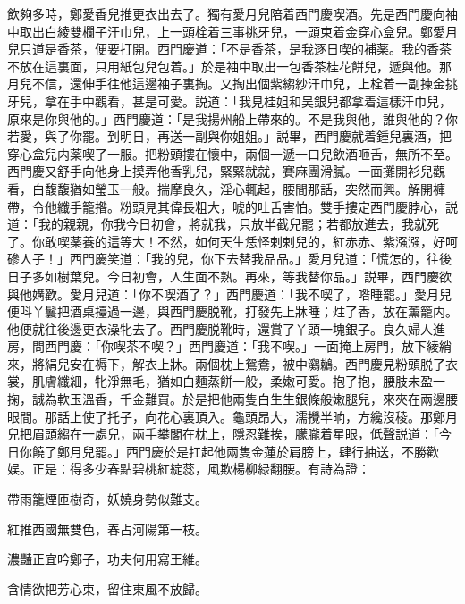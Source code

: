 飲夠多時，鄭愛香兒推更衣出去了。獨有愛月兒陪着西門慶喫酒。先是西門慶向袖中取出白綾雙欄子汗巾兒，上一頭栓着三事挑牙兒，一頭束着金穿心盒兒。鄭愛月兒只道是香茶，便要打開。西門慶道：「不是香茶，是我逐日喫的補薬。我的香茶不放在這裏面，只用紙包兒包着。」於是袖中取出一包香茶桂花餅兒，遞與他。那月兒不信，還伸手往他這邊袖子裏掏。又掏出個紫縐紗汗巾兒，上栓着一副揀金挑牙兒，拿在手中觀看，甚是可愛。説道：「我見桂姐和吴銀兒都拿着這樣汗巾兒，原來是你與他的。」西門慶道：「是我揚州船上帶來的。不是我與他，誰與他的？你若愛，與了你罷。到明日，再送一副與你姐姐。」説畢，西門慶就着鍾兒裏酒，把穿心盒兒内薬喫了一服。把粉頭摟在懷中，兩個一遞一口兒飲酒咂舌，無所不至。西門慶又舒手向他身上摸弄他香乳兒，緊緊就就，賽麻團滑膩。一面攤開衫兒觀看，白馥馥猶如瑩玉一般。揣摩良久，淫心輒起，腰間那話，突然而興。解開褲帶，令他纖手籠揝。粉頭見其偉長粗大，唬的吐舌害怕。雙手摟定西門慶脖心，説道：「我的親親，你我今日初會，將就我，只放半截兒罷；若都放進去，我就死了。你敢喫薬養的這等大！不然，如何天生恁怪剌剌兒的，紅赤赤、紫漒漒，好呵磣人子！」西門慶笑道：「我的兒，你下去替我品品。」愛月兒道：「慌怎的，往後日子多如樹葉兒。今日初會，人生面不熟。再來，等我替你品。」説畢，西門慶欲與他媾歡。愛月兒道：「你不喫酒了？」西門慶道：「我不喫了，喒睡罷。」愛月兒便呌丫鬟把酒桌擡過一邊，與西門慶脱靴，打發先上牀睡；炷了香，放在薰籠内。他便就往後邊更衣澡牝去了。西門慶脱靴時，還賞了丫頭一塊銀子。良久婦人進房，問西門慶：「你喫茶不喫？」西門慶道：「我不喫。」一面掩上房門，放下綾綃來，將絹兒安在褥下，解衣上牀。兩個枕上鴛鴦，被中鸂鶒。西門慶見粉頭脱了衣裳，肌膚纖細，牝淨無毛，猶如白麵蒸餅一般，柔嫩可愛。抱了抱，腰肢未盈一掬，誠為軟玉溫香，千金難買。於是把他兩隻白生生銀條般嫩腿兒，來夾在兩邊腰眼間。那話上使了托子，向花心裏頂入。龜頭昂大，濡攪半晌，方纔沒稜。那鄭月兒把眉頭縐在一處兒，兩手攀閣在枕上，隱忍難挨，朦朧着星眼，低聲説道：「今日你饒了鄭月兒罷。」西門慶於是扛起他兩隻金蓮於肩膀上，肆行抽送，不勝歡娱。正是：得多少春點碧桃紅綻蕊，風欺楊柳緑翻腰。有詩為證：

\begin{myquote}
帶雨籠煙匝樹奇，妖嬈身勢似難支。

紅推西國無雙色，春占河陽第一枝。

濃豔正宜吟鄭子，功夫何用寫王維。

含情欲把芳心束，留住東風不放歸。
\end{myquote}

